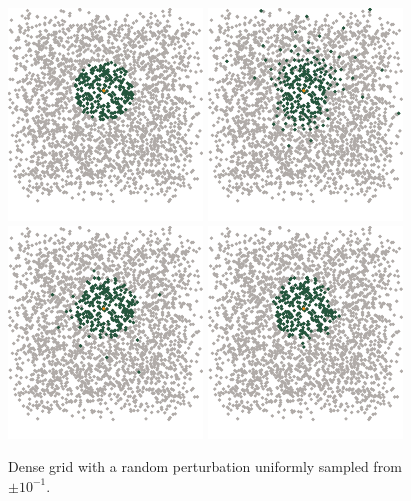 \documentclass[review,supplement,onefignum,onetabnum]{siamonline220329}
\begin{document}
\begin{figure}[H]
  \centering
  \includegraphics{figures/precompiled/grid_1e-1/points_1.pdf}%
  \quad
  \includegraphics{figures/precompiled/grid_1e-1/points_2.pdf}%
  \quad
  \includegraphics{figures/precompiled/grid_1e-1/points_3.pdf}%
  \quad
  \includegraphics{figures/precompiled/grid_1e-1/points_4.pdf}%
  \caption{%
    Dense grid with a random perturbation
    uniformly sampled from \( \pm 10^{-1} \).
  }
\end{figure}
\end{document}
